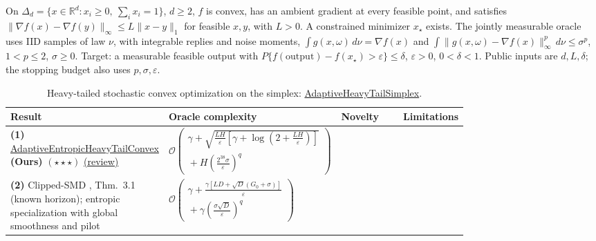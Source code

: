 \begin{table}[tp]
\centering
\caption{Heavy-tailed stochastic convex optimization on the simplex: \href{https://github.com/k3nfalt/longtails/blob/main/LongTails/Setups/AdaptiveHeavyTailSimplex.lean}{AdaptiveHeavyTailSimplex}.}\label{tab:AdaptiveHeavyTailSimplex}
\parbox{\linewidth}{\footnotesize On $\Delta_d=\{x\in\mathbb R^d:x_i\ge0,\ \sum_i x_i=1\}$, $d\ge2$, $f$ is convex, has an ambient gradient at every feasible point, and satisfies $\|\nabla f(x)-\nabla f(y)\|_\infty\le L\|x-y\|_1$ for feasible $x,y$, with $L>0$. A constrained minimizer $x_\star$ exists. The jointly measurable oracle uses IID samples of law $\nu$, with integrable replies and noise moments, $\int g(x,\omega)\,d\nu=\nabla f(x)$ and $\int\|g(x,\omega)-\nabla f(x)\|_\infty^p\,d\nu\le\sigma^p$, $1<p\le2$, $\sigma\ge0$. Target: a measurable feasible output with $P\{f(\mathrm{output})-f(x_\star)>\varepsilon\}\le\delta$, $\varepsilon>0$, $0<\delta<1$. Public inputs are $d,L,\delta$; the stopping budget also uses $p,\sigma,\varepsilon$.}\par\smallskip
\begin{threeparttable}
\footnotesize
\setlength{\tabcolsep}{4pt}\renewcommand{\arraystretch}{1.25}
\begin{tabularx}{\linewidth}{@{}>{\raggedright\arraybackslash}p{0.20\linewidth}>{\raggedright\arraybackslash}p{0.32\linewidth}>{\raggedright\arraybackslash}p{0.25\linewidth}>{\raggedright\arraybackslash}X@{}}
\toprule
\textbf{Result} & \textbf{Oracle complexity} & \textbf{Novelty} & \textbf{Limitations} \\
\midrule
\textbf{(1)} \href{https://github.com/k3nfalt/longtails/blob/main/LongTails/Theorems/AdaptiveEntropicHeavyTailConvex.lean}{Adaptive\allowbreak Entropic\allowbreak Heavy\allowbreak Tail\allowbreak Convex} \textbf{(Ours)} $(\star\star\star)$ \href{https://github.com/k3nfalt/longtails/blob/main/scripts/reviews/AdaptiveEntropicHeavyTailConvex.md}{(review)}
& $\displaystyle\mathcal{O}\!\left(\begin{gathered}\gamma+\sqrt{\frac{LH}{\varepsilon}\left[\gamma+\log\!\left(2+\frac{LH}{\varepsilon}\right)\right]}\\ {}+H\left(\frac{2^{38}\sigma}{\varepsilon}\right)^q\end{gathered}\right)$ & & \\
\midrule[1.2pt]
\textbf{(2)} Clipped-SMD \citep{nguyen2023heavyv2}, Thm.~3.1 (known horizon); entropic specialization with global smoothness and pilot
& $\displaystyle\mathcal{O}\!\left(\begin{gathered}\gamma+\frac{\gamma[LD+\sqrt D(G_0+\sigma)]}{\varepsilon}\\ {}+\gamma\left(\frac{\sigma\sqrt D}{\varepsilon}\right)^q\end{gathered}\right)$

\end{tabularx}
\end{threeparttable}
\end{table}
